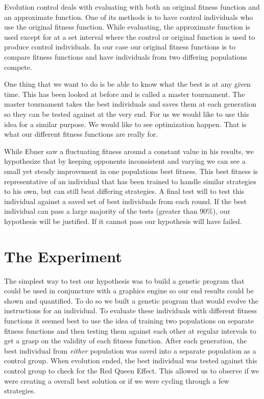 \documentclass{acm_proc_article-sp}
\begin{document}
Evolution control deals with evaluating with both an original fitness function and an approximate function. One of its methods is to have control individuals who use the original fitness function. While evaluating, the approximate function is used except for at a set interval where the control or original function is used to produce control individuals. In our case our original fitness functions is to compare fitness functions and have individuals from two differing populations compete.

One thing that we want to do is be able to know what the best is at any given time. This has been looked at before and is called a master tournament\cite{Red}. The master tournament takes the best individuals and saves them at each generation so they can be tested against at the very end. For us we would like to use this idea for a similar purpose. We would like to see optimization happen. That is what our different fitness functions are really for.

While Ebner saw a fluctuating fitness around a constant value in his results\cite{Ebner}, we hypothesize that by keeping opponents inconsistent and varying we can see a small yet steady improvement in one populations best fitness. This best fitness is representative of an individual that has been trained to handle similar strategies to his own, but can still beat differing strategies. A final test will to test this individual against a saved set of best individuals from each round. If the best individual can pass a large majority of the tests (greater than 90\%), our hypothesis will be justified. If it cannot pass our hypothesis will have failed.

\section{The Experiment} %

The simplest way to test our hypothesis was to build a genetic program that could be used in conjuncture with a graphics engine so our end results could be shown and quantified. To do so we built a genetic program that would evolve the instructions for an individual. To evaluate these individuals with different fitness functions it seemed best to use the idea of training two populations on separate fitness functions and then testing them against each other at regular intervals to get a grasp on the validity of each fitness function. After each generation, the best individual from \textit{either} population was saved into a separate population as a control group. When evolution ended, the best individual was tested against this control group to check for the Red Queen Effect. This allowed us to observe if we were creating a overall best solution or if we were cycling through a few strategies.
\end{document}
